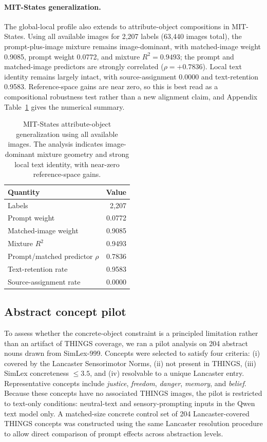 \documentclass{article}
\begin{document}
\paragraph{MIT-States generalization.}
The global-local profile also extends to attribute-object compositions in MIT-States. Using all available images for 2,207 labels (63,440 images total), the prompt-plus-image mixture remains image-dominant, with matched-image weight 0.9085, prompt weight 0.0772, and mixture \(R^2=0.9493\); the prompt and matched-image predictors are strongly correlated (\(\rho=+0.7836\)). Local text identity remains largely intact, with source-assignment 0.0000 and text-retention 0.9583. Reference-space gains are near zero, so this is best read as a compositional robustness test rather than a new alignment claim, and Appendix Table~\ref{tab:mitstates_generalization} gives the numerical summary.

\begin{table}[!htbp]
\centering
\caption{MIT-States attribute-object generalization using all available images. The analysis indicates image-dominant mixture geometry and strong local text identity, with near-zero reference-space gains.}
\label{tab:mitstates_generalization}
\small
\begin{tabular}{lr}
\toprule
Quantity & Value \\
\midrule
Labels & 2,207 \\
Prompt weight & 0.0772 \\
Matched-image weight & 0.9085 \\
Mixture \(R^2\) & 0.9493 \\
Prompt/matched predictor \(\rho\) & 0.7836 \\
Text-retention rate & 0.9583 \\
Source-assignment rate & 0.0000 \\
\bottomrule
\end{tabular}
\end{table}

\subsection{Abstract concept pilot}
\label{app:abstract_concept_pilot}

To assess whether the concrete-object constraint is a principled limitation rather than an artifact of THINGS coverage, we ran a pilot analysis on 204 abstract nouns drawn from SimLex-999. Concepts were selected to satisfy four criteria: (i) covered by the Lancaster Sensorimotor Norms, (ii) not present in THINGS, (iii) SimLex concreteness \(\le 3.5\), and (iv) resolvable to a unique Lancaster entry. Representative concepts include \textit{justice}, \textit{freedom}, \textit{danger}, \textit{memory}, and \textit{belief}. Because these concepts have no associated THINGS images, the pilot is restricted to text-only conditions: neutral-text and sensory-prompting inputs in the Qwen text model only. A matched-size concrete control set of 204 Lancaster-covered THINGS concepts was constructed using the same Lancaster resolution procedure to allow direct comparison of prompt effects across abstraction levels.
\end{document}
